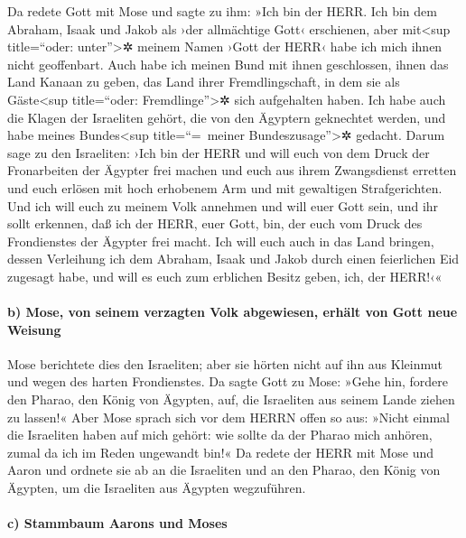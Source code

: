  Da redete Gott mit Mose und sagte zu ihm: »Ich bin der
HERR.  Ich bin dem Abraham, Isaak und Jakob als ›der
allmächtige Gott‹ erschienen, aber mit\textless sup title=``oder:
unter''\textgreater✲ meinem Namen ›Gott der HERR‹ habe ich mich ihnen
nicht geoffenbart.  Auch habe ich meinen Bund mit ihnen
geschlossen, ihnen das Land Kanaan zu geben, das Land ihrer
Fremdlingschaft, in dem sie als Gäste\textless sup title=``oder:
Fremdlinge''\textgreater✲ sich aufgehalten haben.  Ich
habe auch die Klagen der Israeliten gehört, die von den Ägyptern
geknechtet werden, und habe meines Bundes\textless sup title=``=~meiner
Bundeszusage''\textgreater✲ gedacht.  Darum sage zu den
Israeliten: ›Ich bin der HERR und will euch von dem Druck der
Fronarbeiten der Ägypter frei machen und euch aus ihrem Zwangsdienst
erretten und euch erlösen mit hoch erhobenem Arm und mit gewaltigen
Strafgerichten.  Und ich will euch zu meinem Volk annehmen
und will euer Gott sein, und ihr sollt erkennen, daß ich der HERR, euer
Gott, bin, der euch vom Druck des Frondienstes der Ägypter frei macht.
 Ich will euch auch in das Land bringen, dessen Verleihung
ich dem Abraham, Isaak und Jakob durch einen feierlichen Eid zugesagt
habe, und will es euch zum erblichen Besitz geben, ich, der HERR!‹«

\hypertarget{b-mose-von-seinem-verzagten-volk-abgewiesen-erhuxe4lt-von-gott-neue-weisung}{%
\paragraph{b) Mose, von seinem verzagten Volk abgewiesen, erhält von
Gott neue
Weisung}\label{b-mose-von-seinem-verzagten-volk-abgewiesen-erhuxe4lt-von-gott-neue-weisung}}

 Mose berichtete dies den Israeliten; aber sie hörten
nicht auf ihn aus Kleinmut und wegen des harten Frondienstes.
 Da sagte Gott zu Mose:  »Gehe hin,
fordere den Pharao, den König von Ägypten, auf, die Israeliten aus
seinem Lande ziehen zu lassen!«  Aber Mose sprach sich
vor dem HERRN offen so aus: »Nicht einmal die Israeliten haben auf mich
gehört: wie sollte da der Pharao mich anhören, zumal da ich im Reden
ungewandt bin!«  Da redete der HERR mit Mose und Aaron
und ordnete sie ab an die Israeliten und an den Pharao, den König von
Ägypten, um die Israeliten aus Ägypten wegzuführen.

\hypertarget{c-stammbaum-aarons-und-moses}{%
\paragraph{c) Stammbaum Aarons und
Moses}\label{c-stammbaum-aarons-und-moses}}

